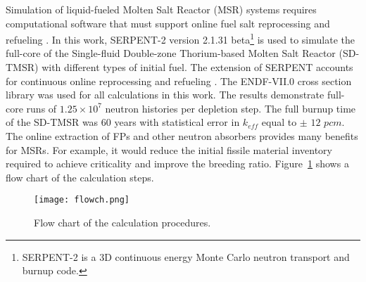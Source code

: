 Simulation of liquid-fueled Molten Salt Reactor (MSR) systems requires 
computational software that must support online fuel salt reprocessing and 
refueling \cite{serp2014molten}. In this work, SERPENT-2 version 2.1.31 
beta\footnote{SERPENT-2 is a 3D continuous energy Monte Carlo neutron 
transport and burnup code.} \cite{leppanen2014serpent} is used to simulate the 
full-core of the Single-fluid Double-zone Thorium-based Molten Salt Reactor (SD-TMSR) with different types of initial fuel. The extension 
of SERPENT accounts for continuous online reprocessing and refueling 
\cite{aufiero2013extended}. The ENDF-VII.0 cross section library was used for all 
calculations in this work. The results demonstrate full-core runs of 
$1.25\times 10^7$ neutron histories per depletion step. The full burnup time of 
the SD-TMSR was 60 years with statistical error in $k_{eff}$ equal to $\pm$ 
$12$ $pcm$. The online extraction of \gls{FPs} and other neutron absorbers 
provides many benefits for MSRs. For example, it would reduce the initial 
fissile material inventory required to achieve criticality and improve the 
breeding ratio. Figure~\ref{fig:flow} shows a flow chart of the calculation 
steps. 

\begin{figure}[t!] %
	\texttt{[image: flowch.png]}
	\caption{Flow chart of the calculation procedures.}
	\label{fig:flow}
\end{figure}

